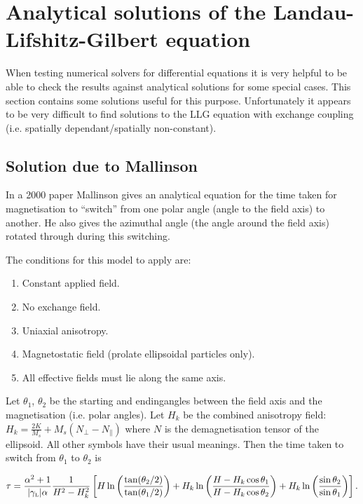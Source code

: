 \section{Analytical solutions of the Landau-Lifshitz-Gilbert equation}

When testing numerical solvers for differential equations it is very
helpful to be able to check the results against analytical solutions for
some special cases. This section contains some solutions useful for this
purpose.
Unfortunately it appears to be very difficult to find solutions to the LLG equation with exchange coupling (i.e. spatially dependant/spatially non-constant).

\subsection{Solution due to Mallinson}

In a 2000 paper\cite{Mallinson2000} Mallinson gives an analytical equation for the time taken for magnetisation to ``switch'' from one polar angle (angle to the field axis) to another.
He also gives the azimuthal angle (the angle around the field axis) rotated through during this switching.

The conditions for this model to apply are:
\begin{enumerate}
\item Constant applied field.
\item No exchange field.
\item Uniaxial anisotropy.
\item Magnetostatic field (prolate ellipsoidal particles only).
\item All effective fields must lie along the same axis.
\end{enumerate}

Let $\theta_1$, $\theta_2$ be the starting and endingangles between the field axis and the magnetisation (i.e. polar angles). Let $H_k$ be the combined anisotropy field: $H_k = \frac{2 K}{M_s} + M_s(N_\perp - N_\parallel)$ where $N$ is the demagnetisation tensor of the ellipsoid. All other symbols have their usual meanings. Then the time taken to switch from $\theta_1$ to $\theta_2$ is

\begin{equation}
  \tau = \frac{\alpha^2 +1}{{|\gamma_{\text{\tiny{L}}}|} \alpha} \frac{1}{H^2 - H_k^2}
  \left[ H \ln \left( \frac{\tan(\theta_2/2)}{\tan(\theta_1/2)} \right)
       + H_k \ln \left( \frac{H - H_k \cos\theta_1}{H - H_k \cos\theta_2} \right)
       + H_k \ln \left( \frac{\sin\theta_2}{\sin\theta_1} \right)
    \right].
\end{equation}

